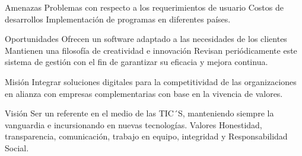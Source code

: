 \documentclass[10pt,a4paper]{article}
\begin{document}
Amenazas
Problemas con respecto a los requerimientos de usuario
Costos de desarrollos 
Implementación de programas en diferentes países.

Oportunidades
Ofrecen un software adaptado a las necesidades de los clientes
Mantienen una filosofía de creatividad e innovación 
Revisan periódicamente este sistema de gestión con el fin de garantizar su eficacia y mejora continua.

Misión
Integrar soluciones digitales para la competitividad de las organizaciones en alianza con empresas complementarias con base en la vivencia de valores.

Visión
Ser un referente en el medio de las TIC´S, manteniendo siempre la vanguardia e incursionando en nuevas tecnologías. 
Valores
Honestidad, transparencia, comunicación, trabajo en equipo, integridad y Responsabilidad Social.
\end{document}
